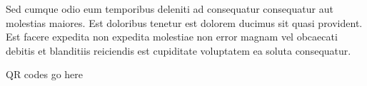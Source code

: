 \documentclass{article}%
\begin{document}
\newline%
Sed cumque odio eum temporibus deleniti ad consequatur consequatur aut molestias maiores. Est doloribus tenetur est dolorem ducimus sit quasi provident. Est facere expedita non expedita molestiae non error magnam vel obcaecati debitis et blanditiis reiciendis est cupiditate voluptatem ea soluta consequatur.%
\vspace*{140pt}%
\begin{center}%
\begin{Huge}%
QR codes go here%
\end{Huge}%
\end{center}%
\newpage%
\end{document}
